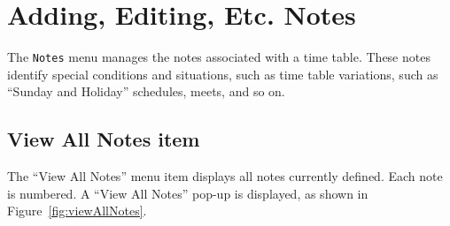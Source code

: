 
\chapter{Adding, Editing, Etc. Notes}
\label{chapt:AddingNotes}

The {\tt Notes} menu manages the notes associated with a time table. 
These notes identify special conditions and situations, such as time
table variations, such as ``Sunday and Holiday'' schedules, meets, and
so on.

\section{View All Notes item}

The ``View All Notes'' menu item displays all notes currently defined. 
Each note is numbered.  A ``View All Notes'' pop-up is displayed, as
shown in Figure~\ref{fig:viewAllNotes}.

